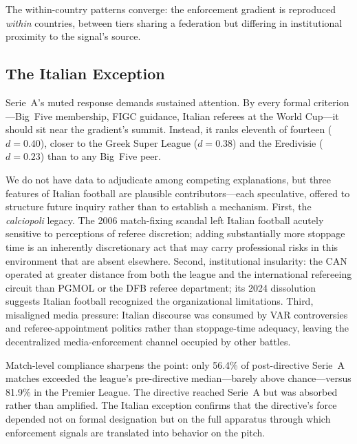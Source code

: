 The within-country patterns converge: the enforcement gradient is
reproduced \textit{within} countries, between tiers sharing a
federation but differing in institutional proximity to the signal's
source.


\subsection{The Italian Exception}
\label{sec:first_stage:italy}

Serie~A's muted response demands sustained attention. By every formal
criterion---Big~Five membership, FIGC guidance, Italian referees at
the World Cup---it should sit near the gradient's summit. Instead, it
ranks eleventh of fourteen ($d = 0.40$), closer to the Greek Super
League ($d = 0.38$) and the Eredivisie ($d = 0.23$) than to any
Big~Five peer.

We do not have data to adjudicate among competing explanations, but
three features of Italian football are plausible contributors---each
speculative, offered to structure future inquiry rather than to
establish a mechanism. First, the \textit{calciopoli} legacy. The 2006
match-fixing scandal left Italian football acutely sensitive to
perceptions of referee discretion; adding substantially more stoppage
time is an inherently discretionary act that may carry professional
risks in this environment that are absent elsewhere. Second,
institutional insularity: the CAN operated at greater distance from
both the league and the international refereeing circuit than PGMOL
or the DFB referee department; its 2024 dissolution suggests Italian
football recognized the organizational limitations. Third, misaligned
media pressure: Italian discourse was consumed by VAR controversies
and referee-appointment politics rather than stoppage-time adequacy,
leaving the decentralized media-enforcement channel occupied by
other battles.

Match-level compliance sharpens the point: only 56.4\% of post-directive
Serie~A matches exceeded the league's pre-directive median---barely
above chance---versus 81.9\% in the Premier League. The directive
reached Serie~A but was absorbed rather than amplified. The Italian
exception confirms that the directive's force depended not on formal
designation but on the full apparatus through which enforcement signals
are translated into behavior on the pitch.


